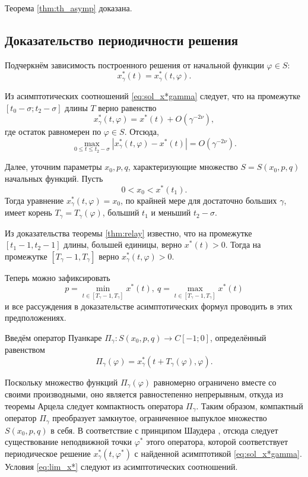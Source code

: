 Теорема \ref{thm:th_asymp} доказана.

\subsection{Доказательство периодичности решения}

Подчеркнём зависимость построенного решения от начальной функции $\varphi \in S$:
\[
x^*_{\gamma}(t) = x^*_{\gamma}(t, \varphi).
\]

Из асимптотических соотношений \eqref{eq:sol_x*gamma} следует, что на промежутке $[t_0 - \sigma; t_2 - \sigma]$ длины $T$ верно равенство
\[
x_\gamma^*(t, \varphi) = x^*(t) + O(\gamma^{-2\nu}),
\]
где остаток равномерен по $\varphi \in S$.
Отсюда,
\[
\max\limits_{0 \leqslant t \leqslant t_2 - \sigma}|x_\gamma^*(t, \varphi) - x^*(t)| = O(\gamma^{-2\nu}).
\]

Далее, уточним параметры $x_0, p, q$, характеризующие множество $S = S(x_0, p, q)$ начальных функций. Пусть
%
\[
0 < x_0 < x^*(t_1).
\]
%
Тогда уравнение $x^*_\gamma(t, \varphi) = x_0$, по крайней мере для достаточно больших $\gamma$, имеет корень $T_\gamma = T_{\gamma}(\varphi)$, больший $t_1$ и меньший $t_2 - \sigma$.

Из доказательства теоремы \ref{thm:relay} известно, что на промежутке $[t_1 - 1, t_2 - 1]$ длины, большей единицы, верно $x^*(t) > 0$. Тогда на промежутке $[T_{\gamma} - 1, T_{\gamma}]$ верно $x^*_{\gamma}(t, \varphi) > 0$.

Теперь можно зафиксировать
\[
p = \min\limits_{t \in [T_\gamma - 1, T_\gamma]} x^*(t), \ q = \max\limits_{t \in [T_\gamma - 1, T_\gamma]} x^*(t)
\]
и все рассуждения в доказательстве асимптотических формул проводить в этих предположениях.

Введём оператор Пуанкаре $\Pi_{\gamma}: S(x_0, p, q) \to C[-1; 0]$, определённый равенством
\begin{equation}
	\Pi_{\gamma}(\varphi) = x^*_{\gamma}(t + T_\gamma(\varphi), \varphi).
\end{equation}

Поскольку множество функций $\Pi_{\gamma}(\varphi)$ равномерно ограничено вместе со своими производными, оно является равностепенно непрерывным, откуда из теоремы Арцела следует компактность оператора $\Pi_{\gamma}$. Таким образом, компактный оператор $\Pi_{\gamma}$ преобразует замкнутое, ограниченное выпуклое множество $S(x_0, p, q)$ в себя. В соответствие с принципом Шаудера \cite{Krasnov1975}, отсюда следует существование неподвижной точки $\varphi^*$ этого оператора, которой соответствует периодическое решение $x^*_\gamma(t, \varphi^*)$ с найденной асимптотикой \eqref{eq:sol_x*gamma}. Условия \eqref{eq:lim_x*} следуют из асимптотических соотношений.


